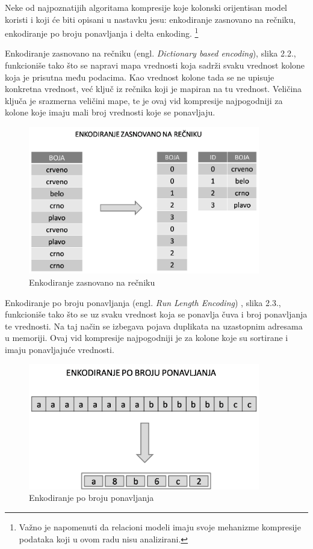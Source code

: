 \documentclass[12pt,oneside]{memoir}
\begin{document}
Neke od najpoznatijih algoritama kompresije koje kolonski orijentisan model koristi i koji će biti opisani u nastavku jesu: enkodiranje zasnovano na rečniku, enkodiranje po broju ponavljanja i delta enkoding. \footnote{Važno je napomenuti da relacioni modeli imaju svoje mehanizme kompresije podataka koji u ovom radu nisu analizirani.}

Enkodiranje zasnovano na rečniku (engl. \textit{Dictionary based encoding}), slika 2.2., funkcioniše tako što se napravi mapa vrednosti koja sadrži svaku vrednost kolone koja je prisutna među podacima. Kao vrednost kolone tada se ne upisuje konkretna vrednost, već ključ iz rečnika koji je mapiran na tu vrednost. Veličina ključa je srazmerna veličini mape, te je ovaj vid kompresije najpogodniji za kolone koje imaju mali broj vrednosti koje se ponavljaju.

\begin{figure}[!ht]
  \centering
  \includegraphics[width=0.9\textwidth]{DictionaryEncoding.png}
  \caption{Enkodiranje zasnovano na rečniku}
  \label{fig:grafikon}
\end{figure}


Enkodiranje po broju ponavljanja  (engl. \textit{Run Length Encoding}) , slika 2.3., funkcioniše tako što se uz svaku vrednost koja se ponavlja čuva i broj ponavljanja te vrednosti. Na taj način se izbegava pojava duplikata na uzastopnim adresama u memoriji. Ovaj vid kompresije najpogodniji je za kolone koje su sortirane i imaju ponavljajuće vrednosti.
\pagebreak


\begin{figure}[!ht]
  \centering
  \includegraphics[width=0.9\textwidth]{run-length-encoding.png}
  \caption{Enkodiranje po broju ponavljanja}
  \label{fig:grafikon}
\end{figure}
\end{document}

